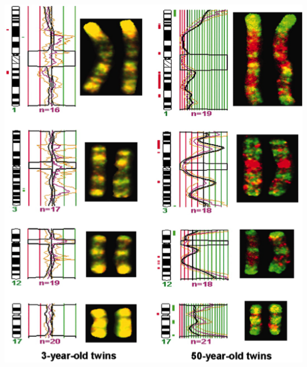 \begin{frame}
\begin{columns}[T]
      \includegraphics[width=\textwidth]{images/cgh_epigenetics}
  \end{columns}   
\end{frame}

